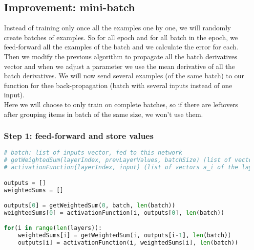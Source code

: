 \documentclass[11pt,a4paper]{report}
\begin{document}
\newpage
\subsection{Improvement: mini-batch}

Instead of training only once all the examples one by one, we will randomly create batches of examples. So for all epoch and for all batch in the epoch, we feed-forward all the examples of the batch and we calculate the error for each. Then we modify the previous algorithm to propagate all the batch derivatives vector and when we adjust a parameter we use the mean derivative of all the batch derivatives.
We will now send several examples (of the same batch) to our function for thee back-propagation (batch with several inputs instead of one input).\\
Here we will choose to only train on complete batches, so if there are leftovers after grouping items in batch of the same size, we won't use them.

\subsubsection{Step 1: feed-forward and store values}

\begin{lstlisting}[language=Python]
# batch: list of inputs vector, fed to this network
# getWeightedSum(layerIndex, prevLayerValues, batchSize) (list of vectors z_i of the layer layerIndex of all items in the batch: it's a matrix)
# activationFunction(layerIndex, input) (list of vectors a_i of the layer layerIndex of all items in the batch: it's a matrix)

outputs = []
weightedSums = []

outputs[0] = getWeightedSum(0, batch, len(batch))
weightedSums[0] = activationFunction(i, outputs[0], len(batch))

for(i in range(len(layers)):
    weightedSums[i] = getWeightedSum(i, outputs[i-1], len(batch))
    outputs[i] = activationFunction(i, weightedSums[i], len(batch))
\end{lstlisting}

\newpage
\end{document}
